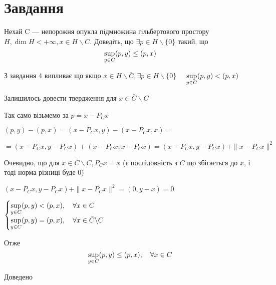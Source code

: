 
\chapter{Завдання \theHchapter}


\begin{tcolorbox}[title=Завдання]
    
    Нехай C — непорожня опукла пiдмножина гiльбертового 
    простору $ H, \dim H < + \infty, x \in H \backslash C $.
    Доведiть, що $ \exists p \in H \backslash \{0\} $ такий, що
    $$ \displaystyle\sup_{y \in C} (p, y) \le (p, x) $$

    
\end{tcolorbox}



З завдання 4 випливає що якщо $ x \in H \backslash \bar{C}, 
\exists p \in H\backslash \{0\} \quad $
$ \displaystyle\sup_{y \in C} (p, y) < (p, x) $

Залишилось довести твердження для $x \in \bar{C} \backslash C$

Так само візьмемо за $ p = x - P_Cx $

$ (p, y) - (p, x) = (x - P_Cx, y) - (x - P_Cx,x) = $


$=(x - P_Cx, y - P_Cx) + (x - P_Cx, x - P_Cx) = 
(x - P_Cx, y - P_Cx) + \| x - P_Cx \|^2$


Очевидно, що для $x \in \bar{C} \backslash C, P_Cx = x $
(є послідовність з $C$ що збігається до $x$, і тоді норма різниці буде 0)  

$(x - P_Cx, y - P_Cx) + \| x - P_Cx \|^2 = (0, y - x) = 0 $


$ 
\begin{cases}
    \displaystyle\sup_{y \in C} (p, y) < (p, x), \quad \forall x \in C \\
    \displaystyle\sup_{y \in C} (p, y) = (p, x), \quad \forall x \in \bar{C} \backslash C
\end{cases} $

Отже 
$$ \displaystyle\sup_{y \in C} (p, y) \le (p, x) , \quad \forall x \in C $$ 


Доведено